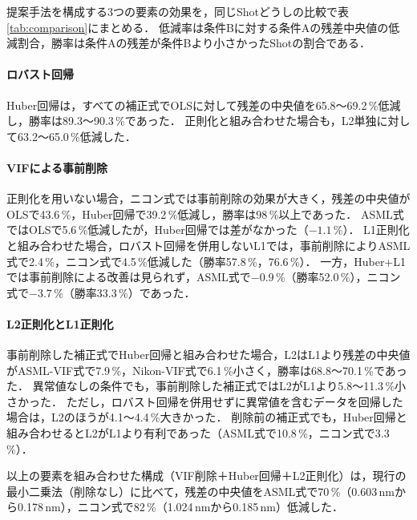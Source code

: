 \documentclass[11pt,a4paper]{ltjsarticle}
\begin{document}
提案手法を構成する3つの要素の効果を，同じShotどうしの比較で表\ref{tab:comparison}にまとめる．
低減率は条件Bに対する条件Aの残差中央値の低減割合，勝率は条件Aの残差が条件Bより小さかったShotの割合である．

\paragraph{ロバスト回帰}
Huber回帰は，すべての補正式でOLSに対して残差の中央値を65.8〜69.2\,\%低減し，勝率は89.3〜90.3\,\%であった．
正則化と組み合わせた場合も，L2単独に対して63.2〜65.0\,\%低減した．

\paragraph{VIFによる事前削除}
正則化を用いない場合，ニコン式では事前削除の効果が大きく，残差の中央値がOLSで43.6\,\%，Huber回帰で39.2\,\%低減し，勝率は98\,\%以上であった．
ASML式ではOLSで5.6\,\%低減したが，Huber回帰では差がなかった（$-1.1$\,\%）．
L1正則化と組み合わせた場合，ロバスト回帰を併用しないL1では，事前削除によりASML式で2.4\,\%，ニコン式で4.5\,\%低減した（勝率57.8\,\%，76.6\,\%）．
一方，Huber+L1では事前削除による改善は見られず，ASML式で$-0.9$\,\%（勝率52.0\,\%），ニコン式で$-3.7$\,\%（勝率33.3\,\%）であった．

\paragraph{L2正則化とL1正則化}
事前削除した補正式でHuber回帰と組み合わせた場合，L2はL1より残差の中央値がASML-VIF式で7.9\,\%，Nikon-VIF式で6.1\,\%小さく，勝率は68.8〜70.1\,\%であった．
異常値なしの条件でも，事前削除した補正式ではL2がL1より5.8〜11.3\,\%小さかった．
ただし，ロバスト回帰を併用せずに異常値を含むデータを回帰した場合は，L2のほうが4.1〜4.4\,\%大きかった．
削除前の補正式でも，Huber回帰と組み合わせるとL2がL1より有利であった（ASML式で10.8\,\%，ニコン式で3.3\,\%）．

以上の要素を組み合わせた構成（VIF削除＋Huber回帰＋L2正則化）は，現行の最小二乗法（削除なし）に比べて，残差の中央値をASML式で70\,\%（0.603\,nmから0.178\,nm），ニコン式で82\,\%（1.024\,nmから0.185\,nm）低減した．
\end{document}
